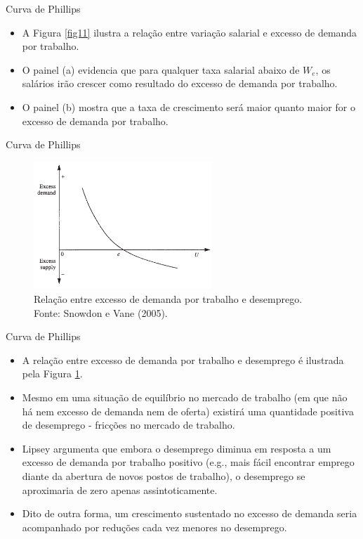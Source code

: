 \documentclass[10pt]{beamer}
\begin{document}
\begin{frame}{Curva de Phillips}
    \begin{itemize}
        \item A Figura \ref{fig11} ilustra a relação entre variação salarial e excesso de demanda por trabalho.
        \bigskip
        \item O painel (a) evidencia que para qualquer taxa salarial abaixo de $W_e$, os salários irão crescer como resultado do excesso de demanda por trabalho.
        \bigskip
        \item O painel (b) mostra que a taxa de crescimento será maior quanto maior for o excesso de demanda por trabalho.
    \end{itemize}
\end{frame}

\begin{frame}{Curva de Phillips}
    \begin{figure}
        \centering
        \includegraphics[width=0.6\textwidth]{./figures/aula8_fig4.PNG}
        \caption{Relação entre excesso de demanda por trabalho e desemprego. Fonte: Snowdon e Vane (2005).}
        \label{fig12}
    \end{figure}
\end{frame}

\begin{frame}{Curva de Phillips}
    \begin{itemize}
        \item A relação entre excesso de demanda por trabalho e desemprego é ilustrada pela Figura \ref{fig12}.
        \bigskip
        \item Mesmo em uma situação de equilíbrio no mercado de trabalho (em que não há nem excesso de demanda nem de oferta) existirá uma quantidade positiva de desemprego - fricções no mercado de trabalho.
        \bigskip
        \item Lipsey argumenta que embora o desemprego diminua em resposta a um excesso de demanda por trabalho positivo (e.g., mais fácil encontrar emprego diante da abertura de novos postos de trabalho), o desemprego se aproximaria de zero apenas assintoticamente.
        \bigskip
        \item Dito de outra forma, um crescimento sustentado no excesso de demanda seria acompanhado por reduções cada vez menores no desemprego.
    \end{itemize}
\end{frame}
\end{document}
